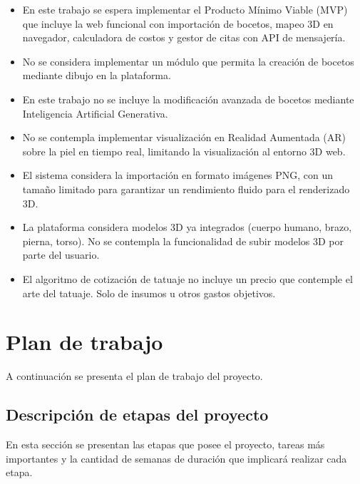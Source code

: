 \begin{itemize}
  \item En este trabajo se espera implementar el Producto Mínimo Viable (MVP) que incluye la web funcional con importación de bocetos, mapeo 3D en navegador, calculadora de costos y gestor de citas con API de mensajería.
  \item No se considera implementar un módulo que permita la creación de bocetos mediante dibujo en la plataforma.
  \item En este trabajo no se incluye la modificación avanzada de bocetos mediante Inteligencia Artificial Generativa.
  \item No se contempla implementar visualización en Realidad Aumentada (AR) sobre la piel en tiempo real, limitando la visualización al entorno 3D web.
  \item El sistema considera la importación en formato imágenes PNG, con un tamaño limitado para garantizar un rendimiento fluido para el renderizado 3D.
  \item La plataforma considera modelos 3D ya integrados (cuerpo humano, brazo, pierna, torso). No se contempla la funcionalidad de subir modelos 3D por parte del usuario.
  \item El algoritmo de cotización de tatuaje no incluye un precio que contemple el arte del tatuaje. Solo de insumos u otros gastos objetivos.
\end{itemize}

\section{Plan de trabajo}

A continuación se presenta el plan de trabajo del proyecto.

\subsection{Descripción de etapas del proyecto}

En esta sección se presentan las etapas que posee el proyecto, tareas más importantes y la cantidad de semanas de duración que implicará realizar cada etapa.

